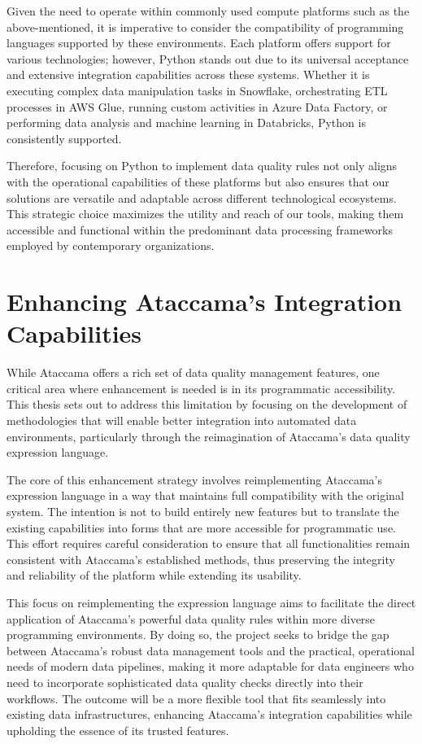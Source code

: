 Given the need to operate within commonly used compute platforms such as the above-mentioned, it is imperative to consider the compatibility of programming languages supported by these environments. Each platform offers support for various technologies; however, Python stands out due to its universal acceptance and extensive integration capabilities across these systems. Whether it is executing complex data manipulation tasks in Snowflake, orchestrating ETL processes in AWS Glue, running custom activities in Azure Data Factory, or performing data analysis and machine learning in Databricks, Python is consistently supported. 

Therefore, focusing on Python to implement data quality rules not only aligns with the operational capabilities of these platforms but also ensures that our solutions are versatile and adaptable across different technological ecosystems. This strategic choice maximizes the utility and reach of our  tools, making them accessible and functional within the predominant data processing frameworks employed by contemporary organizations.

\section{Enhancing Ataccama's Integration Capabilities}

While Ataccama offers a rich set of data quality management features, one critical area where enhancement is needed is in its programmatic accessibility. This thesis sets out to address this limitation by focusing on the development of methodologies that will enable better integration into automated data environments, particularly through the reimagination of Ataccama’s data quality expression language.

The core of this enhancement strategy involves reimplementing Ataccama's expression language in a way that maintains full compatibility with the original system. The intention is not to build entirely new features but to translate the existing capabilities into forms that are more accessible for programmatic use. This effort requires careful consideration to ensure that all functionalities remain consistent with Ataccama’s established methods, thus preserving the integrity and reliability of the platform while extending its usability.

This focus on reimplementing the expression language aims to facilitate the direct application of Ataccama's powerful data quality rules within more diverse programming environments. By doing so, the project seeks to bridge the gap between Ataccama’s robust data management tools and the practical, operational needs of modern data pipelines, making it more adaptable for data engineers who need to incorporate sophisticated data quality checks directly into their workflows. The outcome will be a more flexible tool that fits seamlessly into existing data infrastructures, enhancing Ataccama’s integration capabilities while upholding the essence of its trusted features.


